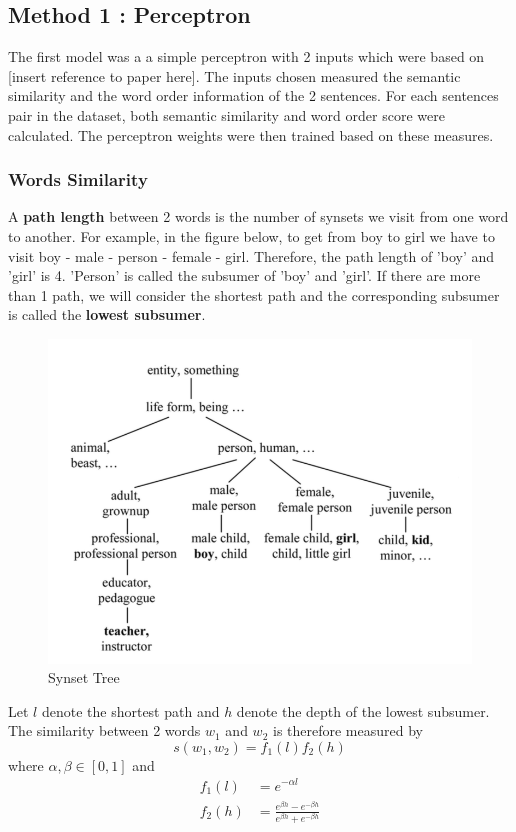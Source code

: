 \subsection{Method 1 : Perceptron}

The first model was a a simple perceptron with 2 inputs which were based on [insert reference to paper here]. The inputs chosen measured the semantic similarity and the word order information of the 2 sentences. For each sentences pair in the dataset, both semantic similarity and word order score were calculated. The perceptron weights were then trained based on these measures.

\subsubsection{Words Similarity}
A \textbf{path length} between 2 words is the number of synsets we visit from one word to another. For example, in the figure below, to get from boy to girl we have to visit boy - male - person - female - girl. Therefore, the path length of 'boy' and 'girl' is 4. 'Person' is called the subsumer of 'boy' and 'girl'. If there are more than 1 path, we will consider the shortest path and the corresponding subsumer is called the \textbf{lowest subsumer}.


 \begin{figure}
\centering
\includegraphics[scale=0.7]{Synset_tree}
\caption{Synset Tree}
 \end{figure}

Let $l$ denote the shortest path and $h$ denote the depth of the lowest subsumer. The similarity between 2 words $w_1$ and $w_2$ is therefore measured by 
\begin{equation*}
s(w_1, w_2) = f_1(l) f_2(h)
\end{equation*}
where $\alpha, \beta \in [0,1]$ and 
\begin{align*}
	f_1(l)		&= e^{-\alpha l} \\
	f_2(h)	&= \frac{e^{\beta h} - e^{-\beta h}}{e^{\beta h} + e^{-\beta h}} \\
\end{align*}

